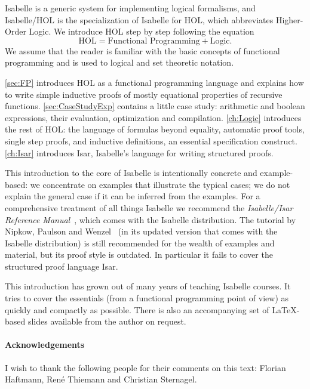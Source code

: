 Isabelle is a generic system for
implementing logical formalisms, and Isabelle/HOL is the specialization
of Isabelle for HOL, which abbreviates Higher-Order Logic. We introduce
HOL step by step following the equation
\[ \mbox{HOL} = \mbox{Functional Programming} + \mbox{Logic}. \]
We assume that the reader is familiar with the basic concepts of functional
programming and is used to logical and set theoretic notation.

\autoref{sec:FP} introduces HOL as a functional programming language and
explains how to write simple inductive proofs of mostly equational properties
of recursive functions.
\sem
\autoref{sec:CaseStudyExp} contains a
little case study: arithmetic and boolean expressions, their evaluation,
optimization and compilation.
\endsem
\autoref{ch:Logic} introduces the rest of HOL: the
language of formulas beyond equality, automatic proof tools, single
step proofs, and inductive definitions, an essential specification construct.
\autoref{ch:Isar} introduces Isar, Isabelle's language for writing structured
proofs.



This introduction to the core of Isabelle is intentionally concrete and
example-based: we concentrate on examples that illustrate the typical cases;
we do not explain the general case if it can be inferred from the examples.
For a comprehensive treatment of all things Isabelle we recommend the
\emph{Isabelle/Isar Reference Manual}~\cite{IsarRef}, which comes with the
Isabelle distribution.
The tutorial by Nipkow, Paulson and Wenzel~\cite{LNCS2283} (in its updated version that comes with the Isabelle distribution) is still recommended for the wealth of examples and material, but its proof style is outdated. In particular it fails to cover the structured proof language Isar.

This introduction has grown out of many years of teaching Isabelle courses.
It tries to cover the essentials (from a functional programming point of
view) as quickly and compactly as possible. There is also an accompanying
set of \LaTeX-based slides available from the author on request.

\paragraph{Acknowledgements}
I wish to thank the following people for their comments on this text:
Florian Haftmann, Ren\'{e} Thiemann and Christian Sternagel.